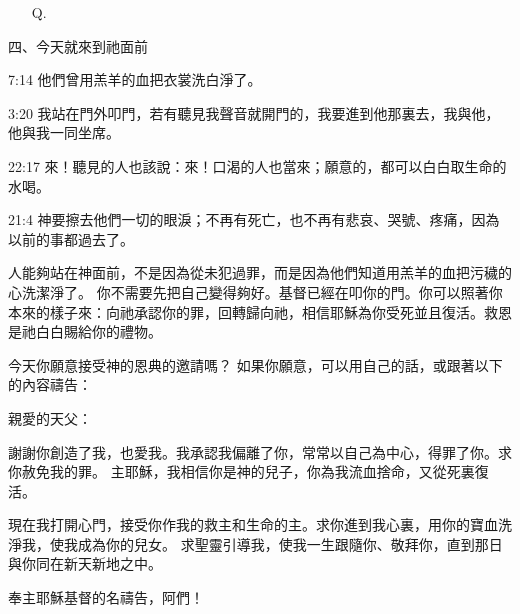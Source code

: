 \begin{center}
\begin{tcolorbox}
\begin{itemize}[leftmargin=2em, labelsep=0.3em]
\item[Q.] 
\end{itemize}

\vspace{0.3cm}
四、今天就來到祂面前

\begin{ScriptureBox}
\item[7:14] 他們曾用羔羊的血把衣裳洗白淨了。
\item[3:20] 我站在門外叩門，若有聽見我聲音就開門的，我要進到他那裏去，我與他，他與我一同坐席。
\item[22:17] 來！聽見的人也該說：來！口渴的人也當來；願意的，都可以白白取生命的水喝。
\item[21:4] 神要擦去他們一切的眼淚；不再有死亡，也不再有悲哀、哭號、疼痛，因為以前的事都過去了。
\end{ScriptureBox}

人能夠站在神面前，不是因為從未犯過罪，而是因為他們知道用羔羊的血把污穢的心洗潔淨了。
你不需要先把自己變得夠好。基督已經在叩你的門。你可以照著你本來的樣子來：向祂承認你的罪，回轉歸向祂，相信耶穌為你受死並且復活。救恩是祂白白賜給你的禮物。

\vspace{0.3cm}


今天你願意接受神的恩典的邀請嗎？
如果你願意，可以用自己的話，或跟著以下的內容禱告：

\begin{tcolorbox}[
    width=\linewidth,
    colback=PrayerGold,
    colframe=GospelMaroon!80,
    colbacktitle=GospelMaroon!80,
    coltitle=white,
    title={決志禱告},
    center title,
    boxrule=0.5pt,
    arc=1.5mm,
    breakable,
    left=1pt,
    right=1pt,
    top=1pt,
    bottom=1pt
]
親愛的天父：

\hspace{0.5cm} 謝謝你創造了我，也愛我。我承認我偏離了你，常常以自己為中心，得罪了你。求你赦免我的罪。 
主耶穌，我相信你是神的兒子，你為我流血捨命，又從死裏復活。

\hspace{0.5cm} 現在我打開心門，接受你作我的救主和生命的主。求你進到我心裏，用你的寶血洗淨我，使我成為你的兒女。
求聖靈引導我，使我一生跟隨你、敬拜你，直到那日與你同在新天新地之中。
 
\hspace{0.5cm} 奉主耶穌基督的名禱告，阿們！
\end{tcolorbox}


\end{tcolorbox}
\end{center}
